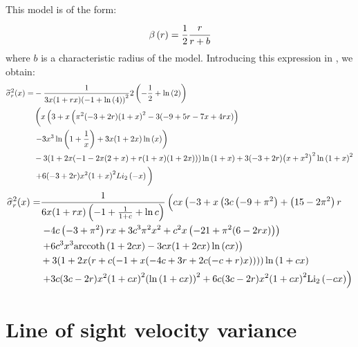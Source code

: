 This model is of the form:
%
\begin{equation}
    \beta \left(r\right) = \frac{1}{2}\cfrac{r}{r+b}
\end{equation}
%
where $b$ is a characteristic radius of the model. Introducing this expression
in , we obtain:
%
\begin{align}
    \widetilde\sigma_r^2(x)=&
        -\frac{1}{3 x (1+r x)
        {(-1+\ln\left(4\right))}^2}2
        \left(-\frac{1}{2}+\ln\left(2\right)\right)\nonumber\\
    &\left(x \left(3+x \left(\pi ^2 (-3+2 r)
        {(1+x)}^2-3 (-9+5 r-7 x+4 r x)
        \right)\right.\vphantom{\ln\left(1+\frac{1}{x}\right)}\right.
        \nonumber\\
    &\left.-3 x^3 \ln\left(1+\frac{1}{x}\right)+3 x (1+2 x)
        \ln\left(x\right)\right)\nonumber\\
    & -3 (1+2 x (-1-2 x (2+x)+r (1+x) (1+2 x)))
        \ln\left(1+x\right)+3 (-3+2 r) {\left(x+x^2\right)}^2
        \ln{\left(1+x\right)}^2\nonumber\\
    & \left.+6 (-3+2 r) x^2 {(1+x)}^2
        Li_2\left(-x\right)\vphantom{\ln\left(1+\frac{1}{x}\right)}\right)
        \nonumber\\
\end{align}
\begin{align}
    \widehat\sigma_r^2(x)=&
        \frac{1}{6 x (1+r x) \left(-1+\frac{1}{1+c}+\ln c\right)}
        \left(c x \left(-3+x \left(3 c \left(-9+\pi ^2\right)+
        \left(15-2 \pi ^2\right) r\right.\right.
        \vphantom{{(1+c x)}^2}\right.\\
    &\left. -4 c \left(-3+\pi ^2\right) r x+
        3 c^3 \pi ^2 x^2+c^2 x \left(-21+\pi ^2 (6-2 r x)\right)\right)\\
    & \left.+6 c^3 x^3 {\rm arccoth} \left(1+2 c x\right)-
        3 c x (1+2 c x) \ln\left(c x\right)\right)\\
    &+3(1+2 x (r+c (-1+x (-4 c+3 r+2 c (-c+r) x))))
        \ln\left(1+c x\right)\\
    &\left.+3c(3 c-2 r) x^2 {(1+c x)}^2 {\left(\ln\left(1+c x\right)\right)}^2+
    6 c (3 c-2 r) x^2 {(1+c x)}^2 \mathrm{Li_2}\left(-c x\right)\right)\\
\end{align}

\section{Line of sight velocity variance}

